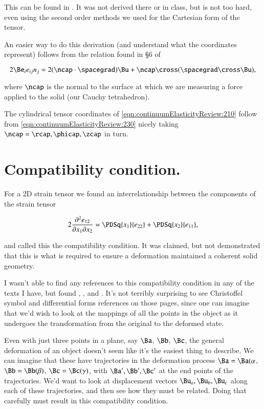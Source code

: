 This can be found in \cite{landau1960theory}.  It was not derived there or in class, but is not too hard, even using the second order methods we used for the Cartesian form of the tensor.

An easier way to do this derivation (and understand what the coordinates represent) follows from the relation found in \S 6 of \cite{acheson1990elementary}

\begin{equation}\label{eqn:continuumElasticityReview:230}
2 \Be_i e_{ij} n_j = 2 (\ncap \cdot \spacegrad) \Bu + \ncap \cross (\spacegrad \cross \Bu),
\end{equation}

where $\ncap$ is the normal to the surface at which we are measuring a force applied to the solid (our Cauchy tetrahedron).

The cylindrical tensor coordinates of \ref{eqn:continuumElasticityReview:210} follow from 
\ref{eqn:continuumElasticityReview:230} nicely taking $\ncap = \rcap, \phicap, \zcap$ in turn.

\section{Compatibility condition.}

For a 2D strain tensor we found an interrelationship between the components of the strain tensor

\begin{equation}\label{eqn:continuumElasticityReview:510}
2 \frac{\partial^2 e_{12}}{\partial x_1 \partial x_2} 
=
\PDSq{x_1}{e_{22}} 
+\PDSq{x_2}{e_{11}},
\end{equation}

and called this the compatibility condition.  It was claimed, but not demonstrated that this is what is required to ensure a deformation maintained a coherent solid geometry.

I wasn't able to find any references to this compatibility condition in any of the texts I have, but found \cite{wiki:compatibilityMechanics}, \cite{wiki:infinitesimalStrainTheory}, and \cite{wiki:saintVenantCompat}.  It's not terribly surprising to see Christoffel symbol and differential forms references on those pages, since one can imagine that we'd wish to look at the mappings of all the points in the object as it undergoes the transformation from the original to the deformed state.

Even with just three points in a plane, say $\Ba$, $\Bb$, $\Bc$, the general deformation of an object doesn't seem like it's the easiest thing to describe.  We can imagine that these have trajectories in the deformation process $\Ba = \Ba(\alpha$, $\Bb = \Bb(\beta)$, $\Bc = \Bc(\gamma)$, with $\Ba', \Bb', \Bc'$ at the end points of the trajectories.  We'd want to look at displacement vectors $\Bu_a, \Bu_b, \Bu_c$ along each of these trajectories, and then see how they must be related.  Doing that carefully must result in this compatibility condition.
